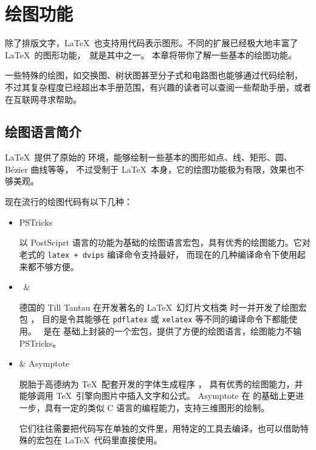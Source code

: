 \chapter{绘图功能}\label{chap:graphics}

\begin{intro}
除了排版文字，\LaTeX\ 也支持用代码表示图形。不同的扩展已经极大地丰富了 \LaTeX\ 的图形功能，\TikZ\ 就是其中之一。
本章将带你了解一些基本的绘图功能。

一些特殊的绘图，如交换图、树状图甚至分子式和电路图也能够通过代码绘制，
不过其复杂程度已经超出本手册范围，有兴趣的读者可以查阅一些帮助手册，或者在互联网寻求帮助。
\end{intro}

\section{绘图语言简介}\label{sec:pict-lang}

\LaTeX\ 提供了原始的  环境，能够绘制一些基本的图形如点、线、矩形、圆、B\'ezier 曲线等等，
不过受制于 \LaTeX\ 本身，它的绘图功能极为有限，效果也不够美观。

现在流行的绘图代码有以下几种：
\begin{itemize}
  \item PSTricks \par
  以 PostSciprt 语言的功能为基础的绘图语言宏包，具有优秀的绘图能力。它对老式的 \texttt{latex + dvips} 编译命令支持最好，
  而现在的几种编译命令下使用起来都不够方便。

  \item \TikZ\ \&  \par
  德国的 Till Tantau 在开发著名的 \LaTeX\ 幻灯片文档类  时一并开发了绘图宏包 ，
  目的是令其能够在 \texttt{pdflatex} 或 \texttt{xelatex} 等不同的编译命令下都能使用。
  \TikZ\ 是在  基础上封装的一个宏包，提供了方便的绘图语言，绘图能力不输 PSTricks。

  \item {} \& Asymptote \par
   脱胎于高德纳为 \TeX\ 配套开发的字体生成程序 ，
  具有优秀的绘图能力，并能够调用 \TeX\ 引擎向图片中插入文字和公式。
  Asymptote 在  的基础上更进一步，具有一定的类似 C 语言的编程能力，支持三维图形的绘制。\par
  它们往往需要把代码写在单独的文件里，用特定的工具去编译，也可以借助特殊的宏包在 \LaTeX\ 代码里直接使用。
\end{itemize}

